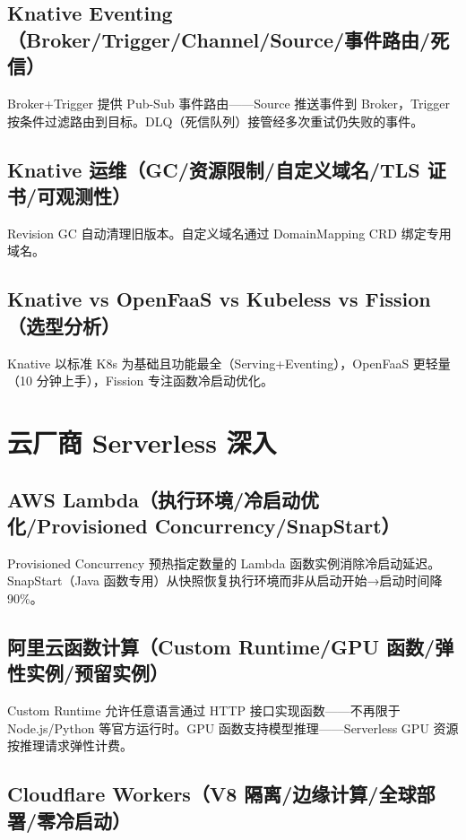 \documentclass[12pt,UTF8]{ctexbook}
\begin{document}
    \subsection{Knative Eventing（Broker/Trigger/Channel/Source/事件路由/死信）}

Broker+Trigger 提供 Pub-Sub 事件路由——Source 推送事件到 Broker，Trigger 按条件过滤路由到目标。DLQ（死信队列）接管经多次重试仍失败的事件。

    \subsection{Knative 运维（GC/资源限制/自定义域名/TLS 证书/可观测性）}

Revision GC 自动清理旧版本。自定义域名通过 DomainMapping CRD 绑定专用域名。

    \subsection{Knative vs OpenFaaS vs Kubeless vs Fission（选型分析）}

Knative 以标准 K8s 为基础且功能最全（Serving+Eventing），OpenFaaS 更轻量（10 分钟上手），Fission 专注函数冷启动优化。

  \section{云厂商 Serverless 深入}
    \subsection{AWS Lambda（执行环境/冷启动优化/Provisioned Concurrency/SnapStart）}

Provisioned Concurrency 预热指定数量的 Lambda 函数实例消除冷启动延迟。SnapStart（Java 函数专用）从快照恢复执行环境而非从启动开始→启动时间降 90\%。

    \subsection{阿里云函数计算（Custom Runtime/GPU 函数/弹性实例/预留实例）}

Custom Runtime 允许任意语言通过 HTTP 接口实现函数——不再限于 Node.js/Python 等官方运行时。GPU 函数支持模型推理——Serverless GPU 资源按推理请求弹性计费。

    \subsection{Cloudflare Workers（V8 隔离/边缘计算/全球部署/零冷启动）}
\end{document}

